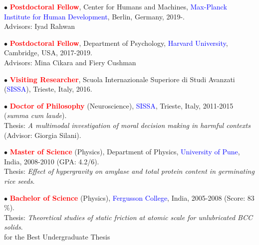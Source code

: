 \documentclass[10pt]{article}
\begin{document}
	\header
	

	$\bullet$ \textbf{\textcolor{red}{Postdoctoral Fellow}}, Center for Humans and Machines, \textcolor{blue}{Max-Planck Institute for Human Development}, \hspace*{0.1in}Berlin, Germany, 2019-.\\
	\hspace*{0.1in}Advisors: Iyad Rahwan\\
	\miniskip
	
	$\bullet$ \textbf{\textcolor{red}{Postdoctoral Fellow}}, Department of Psychology, \textcolor{blue}{Harvard University}, Cambridge, USA, 2017-2019.\\
	\hspace*{0.1in}Advisors: Mina Cikara and Fiery Cushman\\
	\miniskip
	
	$\bullet$ \textbf{\textcolor{red}{Visiting Researcher}}, Scuola Internazionale Superiore di Studi Avanzati (\textcolor{blue}{SISSA}), Trieste, Italy, 2016.\\
	
	
	$\bullet$ \textbf{\textcolor{red}{Doctor of Philosophy}} (Neuroscience), \textcolor{blue}{SISSA}, Trieste, Italy, 2011-2015 (\textit{summa cum laude}).\\ 
	\hspace*{0.1in}Thesis: {\it A multimodal investigation of moral decision making in harmful contexts} (Advisor: Giorgia Silani).\\
	 \miniskip
	
	$\bullet$ \textbf{\textcolor{red}{Master of Science}} (Physics), Department of Physics, \textcolor{blue}{University of Pune}, India, 2008-2010 (GPA: 4.2/6).\\
	\hspace*{0.1in}Thesis: {\it Effect of hypergravity on amylase and total protein content in germinating rice seeds}.
	\miniskip
	
	$\bullet$ \textbf{\textcolor{red}{Bachelor of Science}} (Physics), \textcolor{blue}{Fergusson College}, India, 2005-2008 (Score: 83$\%$).\\
	\hspace*{0.1in}Thesis: {\it Theoretical studies of static friction at atomic scale for unlubricated BCC solids}.\\
	\hspace*{0.1in}{\it Satish Bhide Prize} for the Best Undergraduate Thesis 
	
\end{document}
